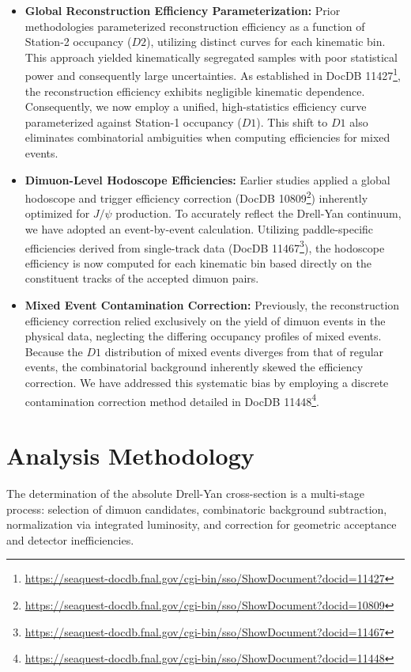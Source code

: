 \documentclass[11pt]{article}
\begin{document}
\begin{itemize}
    \item \textbf{Global Reconstruction Efficiency Parameterization:} Prior methodologies parameterized reconstruction efficiency as a function of Station-2 occupancy ($D2$), utilizing distinct curves for each kinematic bin. This approach yielded kinematically segregated samples with poor statistical power and consequently large uncertainties. As established in DocDB 11427\footnote{\url{https://seaquest-docdb.fnal.gov/cgi-bin/sso/ShowDocument?docid=11427}}, the reconstruction efficiency exhibits negligible kinematic dependence. Consequently, we now employ a unified, high-statistics efficiency curve parameterized against Station-1 occupancy ($D1$). This shift to $D1$ also eliminates combinatorial ambiguities when computing efficiencies for mixed events.
    \item \textbf{Dimuon-Level Hodoscope Efficiencies:} Earlier studies applied a global hodoscope and trigger efficiency correction (DocDB 10809\footnote{\url{https://seaquest-docdb.fnal.gov/cgi-bin/sso/ShowDocument?docid=10809}}) inherently optimized for $J/\psi$ production. To accurately reflect the Drell-Yan continuum, we have adopted an event-by-event calculation. Utilizing paddle-specific efficiencies derived from single-track data (DocDB 11467\footnote{\url{https://seaquest-docdb.fnal.gov/cgi-bin/sso/ShowDocument?docid=11467}}), the hodoscope efficiency is now computed for each kinematic bin based directly on the constituent tracks of the accepted dimuon pairs.
    \item \textbf{Mixed Event Contamination Correction:} Previously, the reconstruction efficiency correction relied exclusively on the yield of dimuon events in the physical data, neglecting the differing occupancy profiles of mixed events. Because the $D1$ distribution of mixed events diverges from that of regular events, the combinatorial background inherently skewed the efficiency correction. We have addressed this systematic bias by employing a discrete contamination correction method detailed in DocDB 11448\footnote{\url{https://seaquest-docdb.fnal.gov/cgi-bin/sso/ShowDocument?docid=11448}}.
\end{itemize}

\section{Analysis Methodology}
\label{sec:methodology}
The determination of the absolute Drell-Yan cross-section is a multi-stage process: selection of dimuon candidates, combinatoric background subtraction, normalization via integrated luminosity, and correction for geometric acceptance and detector inefficiencies.
\end{document}
